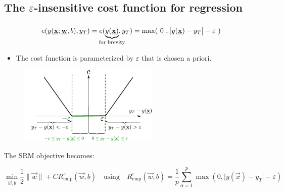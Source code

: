 \subsection{The $\varepsilon$-insensitive cost function for regression}

\begin{frame}\frametitle{\subsecname}

\slidesonly{\vspace{-5mm}}

\begin{equation}
e(y(\vec x; \vec w, b), y_{T})
= e(\underbrace{y(\vec x)}_{\mathclap{\text{for brevity}}}, y_{T})
= \max(~0~, \big|y(\vec x) - y_{T}\big|-\varepsilon~)
\end{equation}

\begin{itemize}
\item The cost function is parameterized by $\varepsilon$ that is chosen a priori.
\end{itemize}

\slidesonly{\vspace{-2mm}}

\begin{figure}[h]
     \centering
	 \includegraphics[width=0.6\textwidth]{img/cost_eps}%
	 \label{fig:cost}
\end{figure}

The SRM objective becomes:

\slidesonly{\vspace{-5mm}}

\begin{equation}
    \min_{\vec w,b} \frac{1}{2} \lVert \vec w \rVert + C R^{\varepsilon}_{\text{emp}}(\vec w,b)
    \quad
    \text{using}\quad R^{\varepsilon}_{\text{emp}}(\vec w,b) = \frac{1}{p}\sum_{\alpha=1}^{p} \max(0, \big|y(\vec x) - y_{T}\big|-\varepsilon)
    \label{eq:srmeps}
\end{equation}
    
\end{frame}

